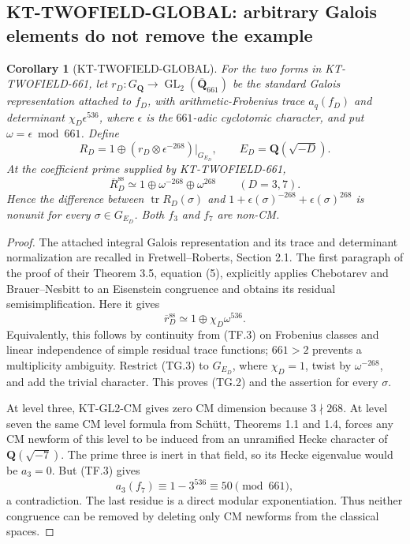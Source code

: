 \documentclass[11pt,a4paper]{article}
\newtheorem{corollary}[theorem]{Corollary}
\theoremstyle{definition}
\begin{document}


\subsection{KT-TWOFIELD-GLOBAL: arbitrary Galois elements do not remove the example}
\label{sec:kt-twofield-global}

\begin{corollary}[KT-TWOFIELD-GLOBAL]
For the two forms in KT-TWOFIELD-661, let
$r_D:G_{\mathbf Q}\to\operatorname{GL}_2(
\overline{\mathbf Q}_{661})$ be the standard Galois
representation attached to $f_D$, with arithmetic-Frobenius
trace $a_q(f_D)$ and determinant
$\chi_D\epsilon^{536}$, where $\epsilon$ is the
$661$-adic cyclotomic character, and put
$\omega=\epsilon\bmod661$. Define
\[
 R_D=1\oplus(r_D\otimes\epsilon^{-268})|_{G_{E_D}},
 \qquad E_D=\mathbf Q(\sqrt{-D}).
                                                               \tag{TG.1}
\]
At the coefficient prime supplied by KT-TWOFIELD-661,
\[
 \overline R_D^{\mathrm{ss}}\simeq
          1\oplus\omega^{-268}\oplus\omega^{268}
                    \qquad(D=3,7).
                                                               \tag{TG.2}
\]
Hence the difference between $\operatorname{tr}R_D(\sigma)$
and $1+\epsilon(\sigma)^{-268}+\epsilon(\sigma)^{268}$
is nonunit for \emph{every} $\sigma\in G_{E_D}$.
Both $f_3$ and $f_7$ are non-CM.
\end{corollary}

\begin{proof}
The attached integral Galois representation and its trace
and determinant normalization are recalled in
Fretwell--Roberts, Section 2.1. The first paragraph of
the proof of their Theorem 3.5, equation (5), explicitly
applies Chebotarev and Brauer--Nesbitt to an Eisenstein
congruence and obtains its residual semisimplification.
Here it gives
\[
              \overline r_D^{\mathrm{ss}}
                     \simeq1\oplus\chi_D\omega^{536}.
                                                               \tag{TG.3}
\]
Equivalently, this follows by continuity from (TF.3) on
Frobenius classes and linear independence of simple
residual trace functions; $661>2$ prevents a multiplicity
ambiguity. Restrict (TG.3) to $G_{E_D}$, where $\chi_D=1$,
twist by $\omega^{-268}$, and add the trivial character.
This proves (TG.2) and the assertion for every $\sigma$.

At level three, KT-GL2-CM gives zero CM dimension because
$3\nmid268$. At level seven the same CM level formula
from Sch\"utt, Theorems 1.1 and 1.4, forces any CM newform
of this level to be induced from an unramified Hecke
character of $\mathbf Q(\sqrt{-7})$. The prime three is
inert in that field, so its Hecke eigenvalue would be
$a_3=0$. But (TF.3) gives
\[
                     a_3(f_7)\equiv1-3^{536}
                                      \equiv50\pmod{661},
                                                               \tag{TG.4}
\]
a contradiction. The last residue is a direct modular
exponentiation. Thus neither congruence can be removed
by deleting only CM newforms from the classical spaces.
\end{proof}
\end{document}

